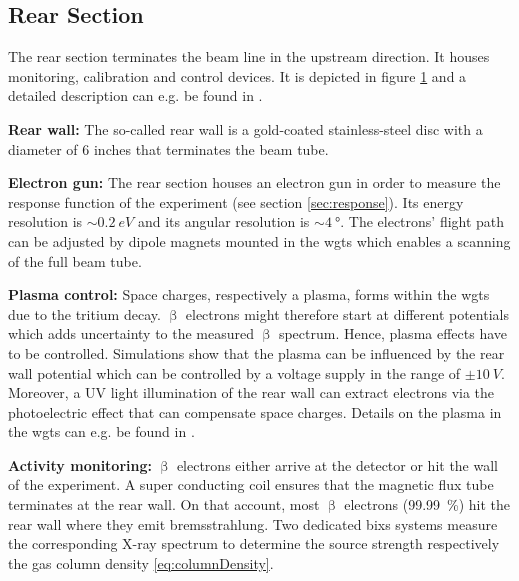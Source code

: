 \subsection{Rear Section}
\label{sec:rearSection}
\begin{figure}[t]
 \label{fig:rearSection}
\end{figure}

The rear section terminates the beam line in the upstream direction. It houses monitoring, calibration and control devices. It is depicted in figure \ref{fig:rearSection} and a detailed description can e.g. be found in \cite{Babutzka2014}.

{\par \textbf{Rear wall:} The so-called rear wall is a gold-coated stainless-steel disc with a diameter of 6 inches that terminates the beam tube.}

{\par\textbf{Electron gun:}
The rear section houses an electron gun in order to measure the response function of the experiment (see section \ref{sec:response}). Its energy resolution is $\sim \SI{0.2}{eV}$ and its angular resolution is $\sim \SI{4}{\degree}$. The electrons' flight path can be adjusted by dipole magnets mounted in the \gls{wgts} which enables a scanning of the full beam tube.}

{\par\textbf{Plasma control:}
Space charges, respectively a plasma, forms within the \gls{wgts} due to the tritium decay. $\upbeta$ electrons might therefore start at different potentials which adds uncertainty to the measured $\upbeta$ spectrum. Hence, plasma effects have to be controlled. Simulations show that the plasma can be influenced by the rear wall potential which can be controlled by a voltage supply in the range of $\pm \SI{10}{V}$. Moreover, a UV light illumination of the rear wall can extract electrons via the photoelectric effect that can compensate space charges. Details on the plasma in the \gls{wgts} can e.g. be found in \cite{Kuckert2018}.}

{\par\textbf{Activity monitoring:}
$\upbeta$ electrons either arrive at the detector or hit the wall of the experiment. A super conducting coil ensures that the magnetic flux tube terminates at the rear wall. On that account, most $\upbeta$ electrons (\SI{99.99}{\percent}) hit the rear wall where they emit bremsstrahlung. Two dedicated \gls{bixs} systems measure the corresponding X-ray spectrum to determine the source strength respectively the gas column density \eqref{eq:columnDensity}.}

